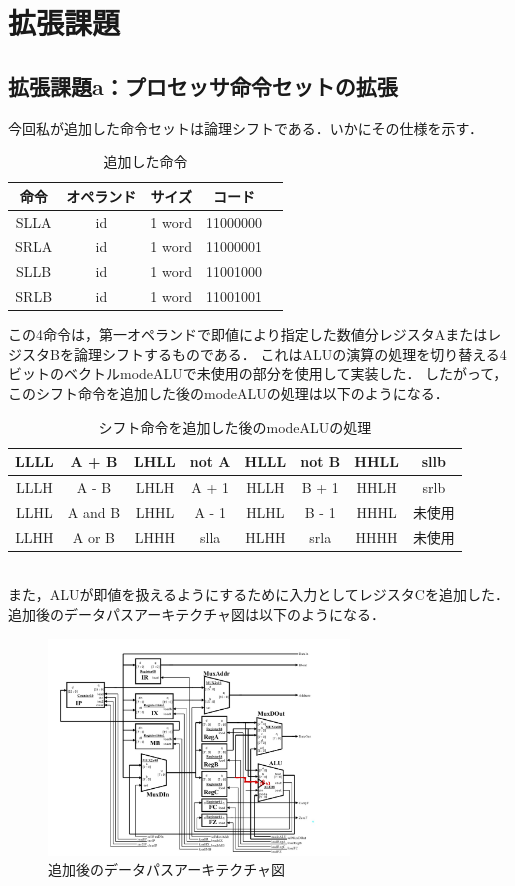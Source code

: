 \documentclass[dvipdfmx]{jarticle}
\begin{document}
\section{拡張課題}
\subsection{拡張課題a：プロセッサ命令セットの拡張}
今回私が追加した命令セットは論理シフトである．いかにその仕様を示す．
\begin{table}[h]
  \centering
  \begin{tabular}{|c||c|c|c|c|}
    \hline
    命令 & オペランド & サイズ & コード\\\hline
    SLLA & id & 1 word & 11000000\\\hline
    SRLA & id & 1 word & 11000001 \\\hline
    SLLB & id & 1 word & 11001000 \\\hline
    SRLB & id & 1 word & 11001001 \\\hline
  \end{tabular}
  \caption{追加した命令}
\end{table}
この4命令は，第一オペランドで即値により指定した数値分レジスタAまたはレジスタBを論理シフトするものである．
これはALUの演算の処理を切り替える4ビットのベクトルmodeALUで未使用の部分を使用して実装した．
したがって，このシフト命令を追加した後のmodeALUの処理は以下のようになる．
\begin{table}[h]
  \centering
  \begin{tabular}{|c|c||c|c||c|c||c|c|}
    \hline
    LLLL & A + B & LHLL & not A & HLLL & not B & HHLL & sllb\\\hline
    LLLH & A - B & LHLH & A + 1 & HLLH  & B + 1 & HHLH & srlb\\\hline
    LLHL & A and B & LHHL & A - 1 & HLHL  & B - 1 & HHHL & 未使用\\\hline
    LLHH & A or B & LHHH & slla & HLHH & srla & HHHH & 未使用\\\hline
  \end{tabular}
  \caption{シフト命令を追加した後のmodeALUの処理}
\end{table}
\\また，ALUが即値を扱えるようにするために入力としてレジスタCを追加した．追加後のデータパスアーキテクチャ図は以下のようになる．
\begin{figure}[h]
  \centering
  \includegraphics[width = 8cm]{improvedatapath.png}
  \caption{追加後のデータパスアーキテクチャ図}
\end{figure}
\end{document}
